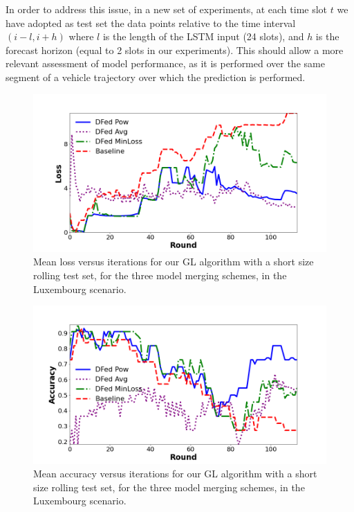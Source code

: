 In order to address this issue, in a new set of experiments, at each time slot $t$ we have adopted as test set the data points relative to the time interval ${(i-l,i+h)}$ where $l$ is the length of the LSTM input (24 slots), and $h$ is the forecast horizon (equal to 2 slots in our experiments). This should allow a more relevant assessment of model performance, as it is performed over the same segment of a vehicle trajectory over which the prediction is performed. 
%
\begin{figure}[t!]
\centering
\includegraphics[width=1\columnwidth]{figures/lossShortRolling3.png} 
\caption{Mean loss versus iterations for our GL algorithm with a short size rolling test set, for the three model merging schemes, in the Luxembourg scenario. \vspace{-0.2in}}
\label{fig:lossS}
\end{figure}
%
\begin{figure}[t!]
\centering
\includegraphics[width=1\columnwidth]{figures/accShortRoll3.png} 
\caption{Mean accuracy versus iterations for our GL algorithm with a short size rolling test set, for the three model merging schemes, in the Luxembourg scenario.\vspace{-0.3in}}
\label{fig:accuracyS}
\end{figure}
